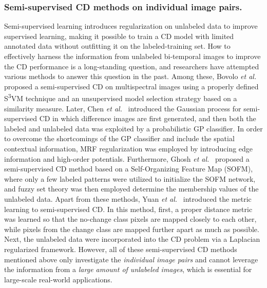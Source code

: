 \documentclass[runningheads]{llncs}
\begin{document}
\subsubsection{Semi-supervised CD methods on individual image pairs.} Semi-supervised learning introduces regularization on unlabeled data to improve supervised learning, making it possible to train a CD model with limited annotated data without outfitting it on the labeled-training set. How to effectively harness the information from unlabeled bi-temporal images to improve the CD performance is a long-standing question, and researchers have attempted various methods to answer this question in the past. Among these, Bovolo \textit{et al.} \cite{semi_SVM}  proposed a semi-supervised CD on multispectral images using a properly defined S\textsuperscript{3}VM technique and an unsupervised model selection strategy based on a similarity measure.  Later, Chen \textit{et al.}~\cite{semi_GP} introduced the Gaussian process for semi-supervised CD in which difference images are first generated, and then both the labeled and unlabeled data was exploited by a probabilistic GP classifier. In order to overcome the shortcomings of the GP classifier and include the spatial contextual information, MRF regularization was employed by introducing edge information and high-order potentials. Furthermore, Ghosh \textit{et al.}~\cite{semi_SOFM} proposed a semi-supervised CD method based on a Self-Organizing Feature Map (SOFM), where only a few labeled patterns were utilized to initialize the SOFM network, and fuzzy set theory was then employed determine the membership values of the unlabeled data. Apart from these methods, Yuan \textit{et al.}~\cite{semi_metric_learning} introduced the metric learning to semi-supervised CD. In this method, first, a proper distance metric was learned so that the no-change class pixels are mapped closely to each other, while pixels from the change class are mapped further apart as much as possible. Next, the unlabeled data were incorporated into the CD problem via a Laplacian regularized framework. However, all of these semi-supervised CD methods mentioned above only investigate the \textit{individual image pairs} and cannot leverage the information from a \textit{large amount of unlabeled images}, which is essential for large-scale real-world applications.
\vspace{-5mm}
\end{document}
